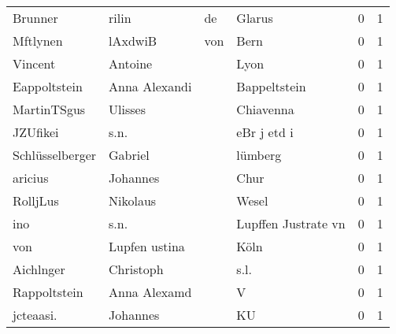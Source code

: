 \begin{center}
\begin{tiny}
\begin{longtabu}{llllrr}
                  Brunner &                              rilin &          de &                                      Glarus &          0 &         1 \\
                 Mftlynen &                            lAxdwiB &         von &                                        Bern &          0 &         1 \\
                  Vincent &                            Antoine &             &                                        Lyon &          0 &         1 \\
             Eappoltstein &                      Anna Alexandi &             &                                Bappeltstein &          0 &         1 \\
              MartinTSgus &                            Ulisses &             &                                   Chiavenna &          0 &         1 \\
                 JZUfikei &                               s.n. &             &                                 eBr j etd i &          0 &         1 \\
          Schlüsselberger &                            Gabriel &             &                                     lümberg &          0 &         1 \\
                  aricius &                           Johannes &             &                                        Chur &          0 &         1 \\
                 RolljLus &                           Nikolaus &             &                                       Wesel &          0 &         1 \\
                      ino &                               s.n. &             &                         Lupffen Justrate vn &          0 &         1 \\
                      von &                      Lupfen ustina &             &                                        Köln &          0 &         1 \\
                Aichlnger &                          Christoph &             &                                        s.l. &          0 &         1 \\
             Rappoltstein &                       Anna Alexamd &             &                                           V &          0 &         1 \\
                jcteaasi. &                           Johannes &             &                                          KU &          0 &         1 \\

\end{longtabu}
\end{tiny}
\end{center}
